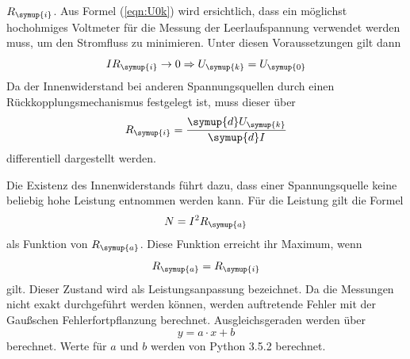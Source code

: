 $R_\symup{i}$.
Aus Formel (\ref{eqn:U0k}) wird ersichtlich, dass ein möglichst hochohmiges
Voltmeter für die Messung der Leerlaufspannung verwendet werden muss, um den
Stromfluss zu minimieren. Unter diesen Voraussetzungen gilt dann
\begin{equation*}
  I R_\symup{i} \rightarrow 0 \Rightarrow U_\symup{k} = U_\symup{0}
\end{equation*}
Da der Innenwiderstand bei anderen Spannungsquellen durch einen
Rückkopplungsmechanismus festgelegt ist, muss dieser über
\begin{equation}
  R_\symup{i}=\frac{\symup{d}U_\symup{k}}{\symup{d}I}
\end{equation}
differentiell dargestellt werden.

Die Existenz des Innenwiderstands führt dazu, dass einer Spannungsquelle keine
beliebig hohe Leistung entnommen werden kann. Für die Leistung gilt die Formel
\begin{equation}
  N=I^2R_\symup{a}
\end{equation}
als Funktion von $R_\symup{a}$. Diese Funktion erreicht ihr Maximum, wenn
\begin{equation*}
  R_\symup{a} = R_\symup{i}
\end{equation*}
gilt. Dieser Zustand wird als Leistungsanpassung bezeichnet.
Da die Messungen nicht exakt durchgeführt werden können, werden auftretende
Fehler mit der Gaußschen Fehlerfortpflanzung berechnet.
Ausgleichsgeraden werden über
\begin{equation}
  y = a \cdot x + b
\end{equation}
berechnet. Werte für $a$ und $b$ werden von Python 3.5.2 berechnet.
